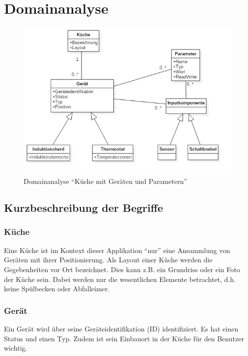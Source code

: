 
\section{Domainanalyse}
\label{sec:Domainanalyse}

\begin{figure}[H]
	\includegraphics[scale=0.6]{analysis/res/Domain}
	\caption{Domainanalyse \enquote{Küche mit Geräten und Parametern}}
\end{figure}


\subsection{Kurzbeschreibung der Begriffe}
\label{subsec:Kurzbeschreibung der Begriffe}

\subsubsection{Küche}
\label{subsubsec:Küche}
Eine Küche ist im Kontext dieser Applikation \enquote{nur} eine Ansammlung von Geräten mit ihrer Positionierung. Als Layout einer Küche werden die Gegebenheiten vor Ort bezeichnet. Dies kann z.B. ein Grundriss oder ein Foto der Küche sein. Dabei werden nur die wesentlichen Elemente betrachtet, d.h. keine Spülbecken oder Abfalleimer.

\subsubsection{Gerät}
\label{subsubsec:Gerät}
Ein Gerät wird über seine Geräteidentifikation (ID) identifiziert. Es hat einen Status und einen Typ. Zudem ist sein Einbauort in der Küche für den Benutzer wichtig.

